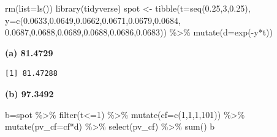 \documentclass[
  a4paper,
  DIV=11,
  numbers=noendperiod]{scrreprt}
\newenvironment{Shaded}{\begin{snugshade}}{\end{snugshade}}
\newcommand{\AttributeTok}[1]{\textcolor[rgb]{0.40,0.45,0.13}{#1}}
\newcommand{\CommentTok}[1]{\textcolor[rgb]{0.37,0.37,0.37}{#1}}
\newcommand{\DecValTok}[1]{\textcolor[rgb]{0.68,0.00,0.00}{#1}}
\newcommand{\FloatTok}[1]{\textcolor[rgb]{0.68,0.00,0.00}{#1}}
\newcommand{\FunctionTok}[1]{\textcolor[rgb]{0.28,0.35,0.67}{#1}}
\newcommand{\NormalTok}[1]{\textcolor[rgb]{0.00,0.23,0.31}{#1}}
\newcommand{\OtherTok}[1]{\textcolor[rgb]{0.00,0.23,0.31}{#1}}
\newcommand{\SpecialCharTok}[1]{\textcolor[rgb]{0.37,0.37,0.37}{#1}}
\begin{document}
\begin{Shaded}
\begin{Highlighting}[]
\FunctionTok{rm}\NormalTok{(}\AttributeTok{list=}\FunctionTok{ls}\NormalTok{())}
\FunctionTok{library}\NormalTok{(tidyverse)}
\NormalTok{spot }\OtherTok{\textless{}{-}} \FunctionTok{tibble}\NormalTok{(}\AttributeTok{t=}\FunctionTok{seq}\NormalTok{(}\FloatTok{0.25}\NormalTok{,}\DecValTok{3}\NormalTok{,}\FloatTok{0.25}\NormalTok{), }
               \AttributeTok{y=}\FunctionTok{c}\NormalTok{(}\FloatTok{0.0633}\NormalTok{,}\FloatTok{0.0649}\NormalTok{,}\FloatTok{0.0662}\NormalTok{,}\FloatTok{0.0671}\NormalTok{,}\FloatTok{0.0679}\NormalTok{,}\FloatTok{0.0684}\NormalTok{,}
                   \FloatTok{0.0687}\NormalTok{,}\FloatTok{0.0688}\NormalTok{,}\FloatTok{0.0689}\NormalTok{,}\FloatTok{0.0688}\NormalTok{,}\FloatTok{0.0686}\NormalTok{,}\FloatTok{0.0683}\NormalTok{)) }\SpecialCharTok{\%\textgreater{}\%} 
  \FunctionTok{mutate}\NormalTok{(}\AttributeTok{d=}\FunctionTok{exp}\NormalTok{(}\SpecialCharTok{{-}}\NormalTok{y}\SpecialCharTok{*}\NormalTok{t))}
\end{Highlighting}
\end{Shaded}

\textbf{(a) 81.4729}

\begin{Shaded}
\end{Shaded}

\begin{verbatim}
[1] 81.47288
\end{verbatim}

\textbf{(b) 97.3492}

\begin{Shaded}
\begin{Highlighting}[]
\NormalTok{b}\OtherTok{=}\NormalTok{spot }\SpecialCharTok{\%\textgreater{}\%}
  \FunctionTok{filter}\NormalTok{(t}\SpecialCharTok{\textless{}=}\DecValTok{1}\NormalTok{) }\SpecialCharTok{\%\textgreater{}\%} 
  \FunctionTok{mutate}\NormalTok{(}\AttributeTok{cf=}\FunctionTok{c}\NormalTok{(}\DecValTok{1}\NormalTok{,}\DecValTok{1}\NormalTok{,}\DecValTok{1}\NormalTok{,}\DecValTok{101}\NormalTok{)) }\SpecialCharTok{\%\textgreater{}\%} 
  \FunctionTok{mutate}\NormalTok{(}\AttributeTok{pv\_cf=}\NormalTok{cf}\SpecialCharTok{*}\NormalTok{d) }\SpecialCharTok{\%\textgreater{}\%} 
  \FunctionTok{select}\NormalTok{(pv\_cf) }\SpecialCharTok{\%\textgreater{}\%} 
  \FunctionTok{sum}\NormalTok{()}
\NormalTok{b}
\end{Highlighting}
\end{Shaded}
\end{document}
